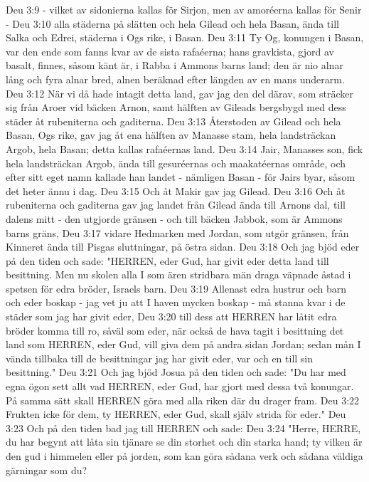 Deu 3:9  - vilket av sidonierna kallas för Sirjon, men av amoréerna kallas för Senir -
Deu 3:10  alla städerna på slätten och hela Gilead och hela Basan, ända till Salka och Edrei, städerna i Ogs rike, i Basan.
Deu 3:11  Ty Og, konungen i Basan, var den ende som fanns kvar av de sista rafaéerna; hans gravkista, gjord av basalt, finnes, såsom känt är, i Rabba i Ammons barns land; den är nio alnar lång och fyra alnar bred, alnen beräknad efter längden av en mans underarm.
Deu 3:12  När vi då hade intagit detta land, gav jag den del därav, som sträcker sig från Aroer vid bäcken Arnon, samt hälften av Gileads bergsbygd med dess städer åt rubeniterna och gaditerna.
Deu 3:13  Återstoden av Gilead och hela Basan, Ogs rike, gav jag åt ena hälften av Manasse stam, hela landsträckan Argob, hela Basan; detta kallas rafaéernas land.
Deu 3:14  Jair, Manasses son, fick hela landsträckan Argob, ända till gesuréernas och maakatéernas område, och efter sitt eget namn kallade han landet - nämligen Basan - för Jairs byar, såsom det heter ännu i dag.
Deu 3:15  Och åt Makir gav jag Gilead.
Deu 3:16  Och åt rubeniterna och gaditerna gav jag landet från Gilead ända till Arnons dal, till dalens mitt - den utgjorde gränsen - och till bäcken Jabbok, som är Ammons barns gräns,
Deu 3:17  vidare Hedmarken med Jordan, som utgör gränsen, från Kinneret ända till Pisgas sluttningar, på östra sidan.
Deu 3:18  Och jag bjöd eder på den tiden och sade: "HERREN, eder Gud, har givit eder detta land till besittning. Men nu skolen alla I som ären stridbara män draga väpnade åstad i spetsen för edra bröder, Israels barn.
Deu 3:19  Allenast edra hustrur och barn och eder boskap - jag vet ju att I haven mycken boskap - må stanna kvar i de städer som jag har givit eder,
Deu 3:20  till dess att HERREN har låtit edra bröder komma till ro, såväl som eder, när också de hava tagit i besittning det land som HERREN, eder Gud, vill giva dem på andra sidan Jordan; sedan mån I vända tillbaka till de besittningar jag har givit eder, var och en till sin besittning."
Deu 3:21  Och jag bjöd Josua på den tiden och sade: "Du har med egna ögon sett allt vad HERREN, eder Gud, har gjort med dessa två konungar. På samma sätt skall HERREN göra med alla riken där du drager fram.
Deu 3:22  Frukten icke för dem, ty HERREN, eder Gud, skall själv strida för eder."
Deu 3:23  Och på den tiden bad jag till HERREN och sade:
Deu 3:24  "Herre, HERRE, du har begynt att låta sin tjänare se din storhet och din starka hand; ty vilken är den gud i himmelen eller på jorden, som kan göra sådana verk och sådana väldiga gärningar som du?
